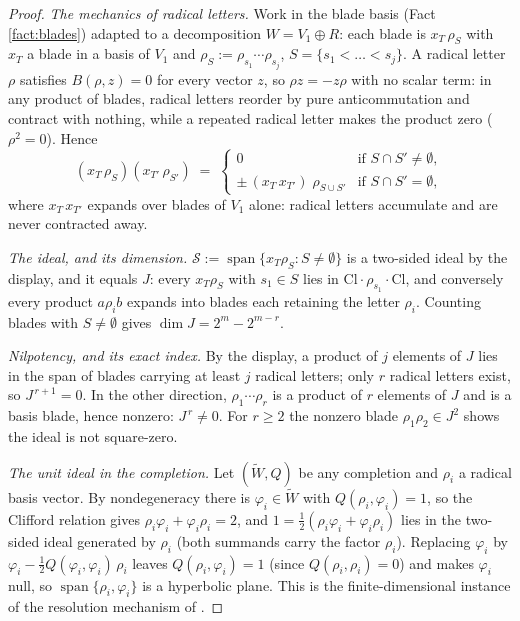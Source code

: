 \documentclass[11pt]{article}
\theoremstyle{definition}
\newcommand{\Cl}{\mathrm{Cl}}
\begin{document}
\begin{proof}
\emph{The mechanics of radical letters.} Work in the blade basis (Fact \ref{fact:blades}) adapted to a decomposition $W = V_1 \oplus R$: each blade is $x_T\, \rho_S$ with $x_T$ a blade in a basis of $V_1$ and $\rho_S := \rho_{s_1} \cdots \rho_{s_j}$, $S = \{s_1 < \dots < s_j\}$. A radical letter $\rho$ satisfies $B(\rho, z) = 0$ for every vector $z$, so $\rho z = -z\rho$ with no scalar term: in any product of blades, radical letters reorder by pure anticommutation and contract with nothing, while a repeated radical letter makes the product zero ($\rho^2 = 0$). Hence
\[
(x_T\, \rho_S)(x_{T'}\, \rho_{S'}) \;=\;
\begin{cases}
0 & \text{if } S \cap S' \neq \emptyset, \\
\pm\, (x_T\, x_{T'})\; \rho_{S \cup S'} & \text{if } S \cap S' = \emptyset ,
\end{cases}
\]
where $x_T\, x_{T'}$ expands over blades of $V_1$ alone: radical letters accumulate and are never contracted away.

\emph{The ideal, and its dimension.} $\mathcal{S} := \operatorname{span}\{x_T \rho_S : S \neq \emptyset\}$ is a two-sided ideal by the display, and it equals $J$: every $x_T \rho_S$ with $s_1 \in S$ lies in $\Cl \cdot \rho_{s_1} \cdot \Cl$, and conversely every product $a \rho_i b$ expands into blades each retaining the letter $\rho_i$. Counting blades with $S \neq \emptyset$ gives $\dim J = 2^m - 2^{m-r}$.

\emph{Nilpotency, and its exact index.} By the display, a product of $j$ elements of $J$ lies in the span of blades carrying at least $j$ radical letters; only $r$ radical letters exist, so $J^{\,r+1} = 0$. In the other direction, $\rho_1 \cdots \rho_r$ is a product of $r$ elements of $J$ and is a basis blade, hence nonzero: $J^{\,r} \neq 0$. For $r \geq 2$ the nonzero blade $\rho_1 \rho_2 \in J^2$ shows the ideal is not square-zero.

\emph{The unit ideal in the completion.} Let $(\widetilde W, Q)$ be any completion and $\rho_i$ a radical basis vector. By nondegeneracy there is $\varphi_i \in \widetilde W$ with $Q(\rho_i, \varphi_i) = 1$, so the Clifford relation gives $\rho_i \varphi_i + \varphi_i \rho_i = 2$, and $1 = \tfrac12(\rho_i \varphi_i + \varphi_i \rho_i)$ lies in the two-sided ideal generated by $\rho_i$ (both summands carry the factor $\rho_i$). Replacing $\varphi_i$ by $\varphi_i - \tfrac12 Q(\varphi_i, \varphi_i)\, \rho_i$ leaves $Q(\rho_i, \varphi_i) = 1$ (since $Q(\rho_i, \rho_i) = 0$) and makes $\varphi_i$ null, so $\operatorname{span}\{\rho_i, \varphi_i\}$ is a hyperbolic plane. This is the finite-dimensional instance of the resolution mechanism of \cite[Prop.~3.4]{ButlerT4}.
\end{proof}
\end{document}

